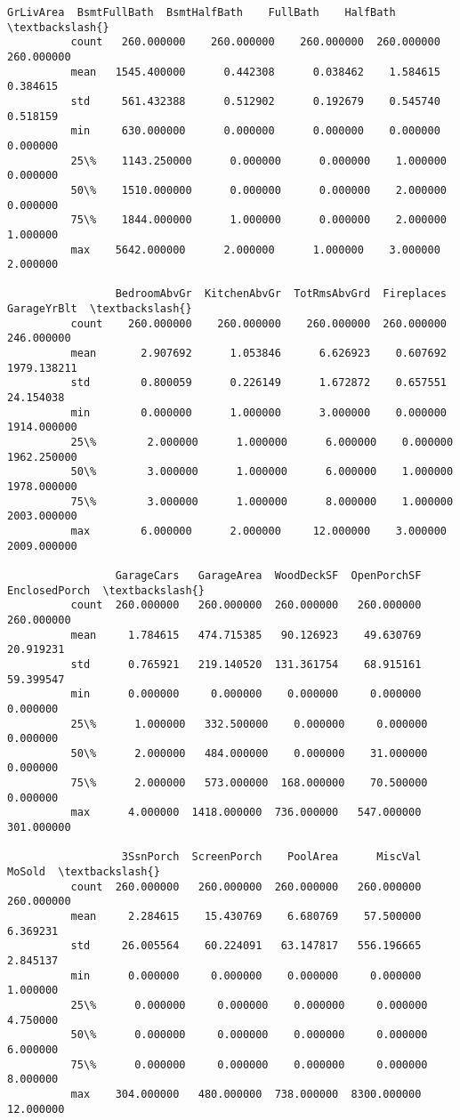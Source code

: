 \documentclass[11pt]{article}
\begin{document}
\begin{Verbatim}[commandchars=\\\{\}]
                   GrLivArea  BsmtFullBath  BsmtHalfBath    FullBath    HalfBath  \textbackslash{}
          count   260.000000    260.000000    260.000000  260.000000  260.000000   
          mean   1545.400000      0.442308      0.038462    1.584615    0.384615   
          std     561.432388      0.512902      0.192679    0.545740    0.518159   
          min     630.000000      0.000000      0.000000    0.000000    0.000000   
          25\%    1143.250000      0.000000      0.000000    1.000000    0.000000   
          50\%    1510.000000      0.000000      0.000000    2.000000    0.000000   
          75\%    1844.000000      1.000000      0.000000    2.000000    1.000000   
          max    5642.000000      2.000000      1.000000    3.000000    2.000000   
          
                 BedroomAbvGr  KitchenAbvGr  TotRmsAbvGrd  Fireplaces  GarageYrBlt  \textbackslash{}
          count    260.000000    260.000000    260.000000  260.000000   246.000000   
          mean       2.907692      1.053846      6.626923    0.607692  1979.138211   
          std        0.800059      0.226149      1.672872    0.657551    24.154038   
          min        0.000000      1.000000      3.000000    0.000000  1914.000000   
          25\%        2.000000      1.000000      6.000000    0.000000  1962.250000   
          50\%        3.000000      1.000000      6.000000    1.000000  1978.000000   
          75\%        3.000000      1.000000      8.000000    1.000000  2003.000000   
          max        6.000000      2.000000     12.000000    3.000000  2009.000000   
          
                 GarageCars   GarageArea  WoodDeckSF  OpenPorchSF  EnclosedPorch  \textbackslash{}
          count  260.000000   260.000000  260.000000   260.000000     260.000000   
          mean     1.784615   474.715385   90.126923    49.630769      20.919231   
          std      0.765921   219.140520  131.361754    68.915161      59.399547   
          min      0.000000     0.000000    0.000000     0.000000       0.000000   
          25\%      1.000000   332.500000    0.000000     0.000000       0.000000   
          50\%      2.000000   484.000000    0.000000    31.000000       0.000000   
          75\%      2.000000   573.000000  168.000000    70.500000       0.000000   
          max      4.000000  1418.000000  736.000000   547.000000     301.000000   
          
                  3SsnPorch  ScreenPorch    PoolArea      MiscVal      MoSold  \textbackslash{}
          count  260.000000   260.000000  260.000000   260.000000  260.000000   
          mean     2.284615    15.430769    6.680769    57.500000    6.369231   
          std     26.005564    60.224091   63.147817   556.196665    2.845137   
          min      0.000000     0.000000    0.000000     0.000000    1.000000   
          25\%      0.000000     0.000000    0.000000     0.000000    4.750000   
          50\%      0.000000     0.000000    0.000000     0.000000    6.000000   
          75\%      0.000000     0.000000    0.000000     0.000000    8.000000   
          max    304.000000   480.000000  738.000000  8300.000000   12.000000   
          

\end{Verbatim}
\end{document}
